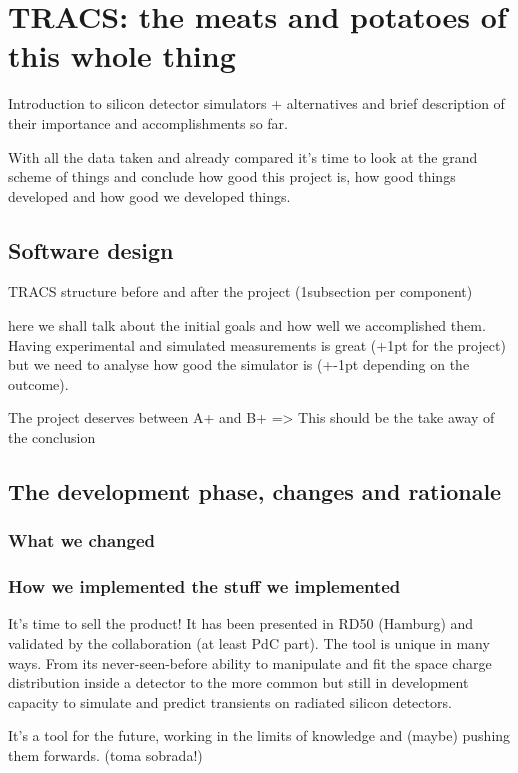 \chapter{TRACS: the meats and potatoes of this whole thing}

Introduction to silicon detector simulators + alternatives and brief description of their importance and accomplishments so far.

With all the data taken and already compared it's time to look at the grand scheme of things and conclude how good this project is, how good things developed and how good we developed things.

\section{Software design} %
\label{sec:results_and_achievements}

TRACS structure before and after the project (1subsection per component)

here we shall talk about the initial goals and how well we accomplished them. Having experimental and simulated measurements is great (+1pt for the project) but we need to analyse how good the simulator is (+-1pt depending on the outcome).

The project deserves between A+ and B+ => This should be the take away of the conclusion


\section{The development phase, changes and rationale} %
\label{sec:let_s_put_the_project_in_perspective}

\subsection{What we changed}

\subsection{How we implemented the stuff we implemented}

It's time to sell the product! It has been presented in RD50 (Hamburg) and validated by the collaboration (at least PdC part). The tool is unique in many ways. From its never-seen-before ability to manipulate and fit the space charge distribution inside a detector to the more common but still in development capacity to simulate and predict transients on radiated silicon detectors.

It's a tool for the future, working in the limits of knowledge and (maybe) pushing them forwards. (toma sobrada!)

